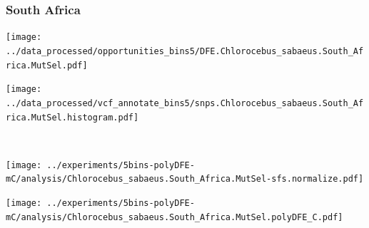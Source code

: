 \subsubsection{South Africa}

\begin{minipage}{0.49\linewidth}
    \texttt{[image: ../data\_processed/opportunities\_bins5/DFE.Chlorocebus\_sabaeus.South\_Africa.MutSel.pdf]}
\end{minipage}
\begin{minipage}{0.49\linewidth}
    \texttt{[image: ../data\_processed/vcf\_annotate\_bins5/snps.Chlorocebus\_sabaeus.South\_Africa.MutSel.histogram.pdf]}
\end{minipage}
\\
\begin{minipage}{0.49\linewidth}
    \texttt{[image: ../experiments/5bins-polyDFE-mC/analysis/Chlorocebus\_sabaeus.South\_Africa.MutSel-sfs.normalize.pdf]}
\end{minipage}
\begin{minipage}{0.4\linewidth}
    \texttt{[image: ../experiments/5bins-polyDFE-mC/analysis/Chlorocebus\_sabaeus.South\_Africa.MutSel.polyDFE\_C.pdf]}
\end{minipage}
